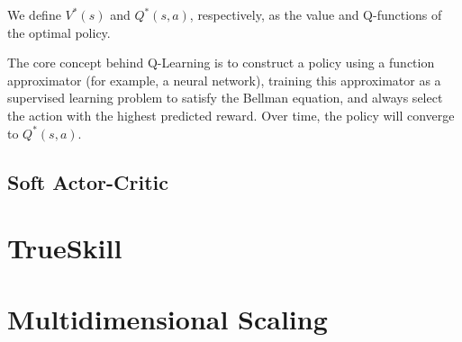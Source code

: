 We define $V^*(s)$ and $Q^*(s, a)$, respectively, as the value and Q-functions of the optimal policy.

The core concept behind Q-Learning is to construct a policy using a function approximator (for example, a neural network), training this approximator as a supervised learning problem to satisfy the Bellman equation, and always select the action with the highest predicted reward.
Over time, the policy will converge to $Q^*(s, a)$\cite{Qlearn_convergence}.



\subsection{Soft Actor-Critic}


\section{TrueSkill}


\section{Multidimensional Scaling}